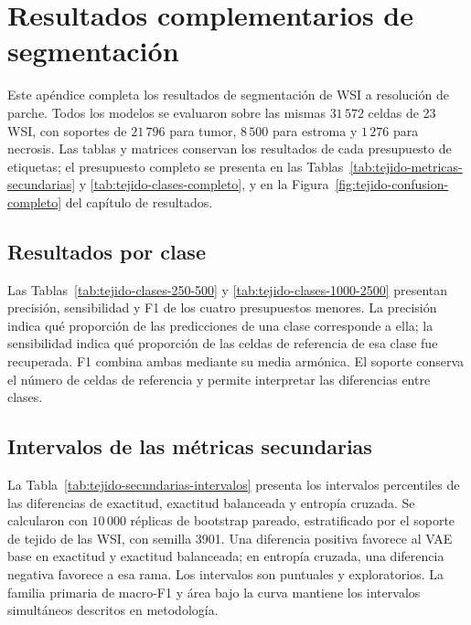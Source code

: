 \chapter{Resultados complementarios de segmentación}
\label{app:tejido-complementario}

Este apéndice completa los resultados de segmentación de WSI a resolución de
parche. Todos los modelos se evaluaron sobre las mismas \(31\,572\) celdas
de 23 WSI, con soportes de \(21\,796\) para tumor, \(8\,500\) para estroma
y \(1\,276\) para necrosis. Las tablas y matrices conservan los resultados
de cada presupuesto de etiquetas; el presupuesto completo se presenta en las
Tablas~\ref{tab:tejido-metricas-secundarias} y
\ref{tab:tejido-clases-completo}, y en la
Figura~\ref{fig:tejido-confusion-completo} del capítulo de resultados.

\section{Resultados por clase}

Las Tablas~\ref{tab:tejido-clases-250-500} y
\ref{tab:tejido-clases-1000-2500} presentan precisión, sensibilidad y F1 de
los cuatro presupuestos menores. La precisión indica qué proporción de las
predicciones de una clase corresponde a ella; la sensibilidad indica qué
proporción de las celdas de referencia de esa clase fue recuperada. F1 combina
ambas mediante su media armónica. El soporte conserva el número de celdas de
referencia y permite interpretar las diferencias entre clases.




\clearpage

\section{Intervalos de las métricas secundarias}

La Tabla~\ref{tab:tejido-secundarias-intervalos} presenta los intervalos
percentiles de las diferencias de exactitud, exactitud balanceada y entropía
cruzada. Se calcularon con \(10\,000\) réplicas de bootstrap pareado,
estratificado por el soporte de tejido de las WSI, con semilla 3901. Una
diferencia positiva favorece al VAE base en exactitud y exactitud balanceada;
en entropía cruzada, una diferencia negativa favorece a esa rama. Los
intervalos son puntuales y exploratorios. La familia primaria de macro-F1 y
área bajo la curva mantiene los intervalos simultáneos descritos en
metodología.

